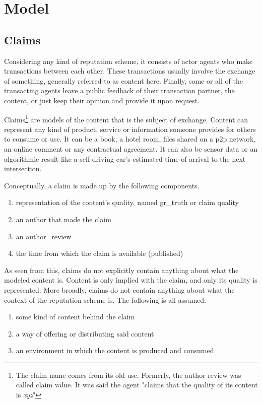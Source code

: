 \documentclass[%
    ]{\PathToTumTemplate/thesis/tum_thesis}
\begin{document}
\section{Model}\label{sec:approach_model}

\subsection{Claims}\label{sec:approach_claims}
Considering any kind of reputation scheme, it consists of actor agents who make transactions between each other.
These transactions usually involve the exchange of something, generally referred to as content here.
Finally, some or all of the transacting agents leave a public feedback of their transaction partner, the content, or just keep their opinion and provide it upon request.

Claims\footnote{The claim name comes from its old use. Formerly, the author review was called claim value. It was said the agent "claims that the quality of its content is \emph{xyz}"} are models of the content that is the subject of exchange.
Content can represent any kind of product, service or information someone provides for others to consume or use.
It can be a book, a hotel room, files shared on a \acrlong{p2p} network, an online comment or any contractual agreement.
It can also be sensor data or an algorithmic result like a self-driving car's estimated time of arrival to the next intersection.

Conceptually, a claim is made up by the following components.
\begin{enumerate}
	\item representation of the content's quality, named \gls{gr_truth} or claim quality
	\item an author that made the claim
	\item an \gls{author_review}
	\item the time from which the claim is available (published)
\end{enumerate}

As seen from this, claims do not explicitly contain anything about what the modeled content is.
Content is only implied with the claim, and only its quality is represented.
More broadly, claims do not contain anything about what the context of the reputation scheme is.
The following is all assumed:
\begin{enumerate}
	\item some kind of content behind the claim
	\item a way of offering or distributing said content
	\item an environment in which the content is produced and consumed
\end{enumerate}
\end{document}
